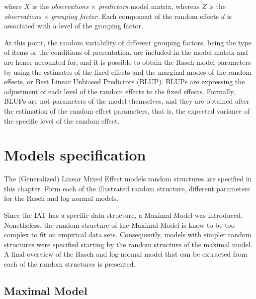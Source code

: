 \documentclass[12pt]{book}
\begin{document}
where $X$ is the \emph{observations} $\times$ \emph{predictors} model matrix, whereas $Z$ is the \emph{observations} $\times$ \emph{grouping factor}. Each component of the random effects $d$ is associated with a level of the grouping factor.  

At this point, the random variability of different grouping factors, being the type of items or the conditions of presentation, are included in the model matrix and are hence accounted for, and it is possible to obtain the Rasch model parameters by using the estimates of the fixed effects and the marginal modes of the random effects, or Best Linear Unbiased Predictors (BLUP). BLUPs are expressing the adjustment of each level of the random effects to the fixed effects. Formally, BLUPs are not parameters of the model themselves, and they are obtained after the estimation of the random effect parameters, that is, the expected variance of the specific level of the random effect.


\chapter{Models specification}

The (Generalized) Linear Mixed Effect models random structures are specified in this chapter. Form each of the illustrated random structure, different parameters for the Rasch and log-normal models. 

Since the IAT has a specific data structure, a Maximal Model was introduced. Nonetheless, the random structure of the Maximal Model is know to be too complex to fit on empirical data sets. Consequently, models with simpler random structures were specified starting by the random structure of the maximal model. A final overview of the Rasch and log-normal model that can be extracted from each of the random structures is presented. 

\newpage
\section{Maximal Model}
\end{document}
